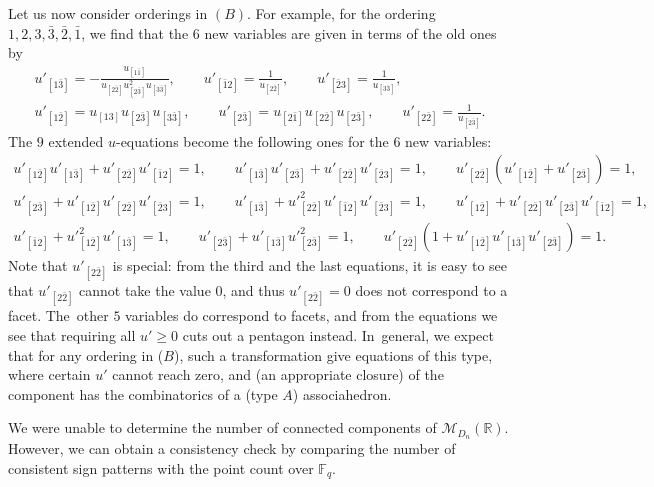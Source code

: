 \documentclass[10pt,a4paper]{amsart}
\def\R{{\mathbb R}}
\def\F{{\mathbb F}}
\def\M{{\mathcal{M}}}
\numberwithin{equation}{section}
\begin{document}
Let us now consider orderings in $(B)$. For example, for the ordering $1, 2, 3, \bar{3}, \bar{2}, \bar{1}$, we find that the $6$ new variables are given in terms of the old ones by
\begin{gather*}
u'_{[1 \bar{3}]}=-\frac{u_{[1 \bar{1}]}}{u_{[2 \bar{2}]} u^2_{[2 \bar{3}]} u_{[3 \bar{3}]}},\qquad u'_{[\bar{1} 2]}=\frac{1}{u_{[2 \bar{2}]}},\qquad
u'_{[\bar{2} 3]}=\frac{1}{u_{[3 \bar{3}]}},
\\
u'_{[1 \bar{2}]}=u_{[13]} u_{[2 \bar{3}]} u_{[3 \bar{3}]},\qquad
u'_{[2 \bar{3}]}=u_{[2 \bar{1}]} u_{[2 \bar{2}]} u_{[2 \bar{3}]},\qquad
u'_{[2 \bar{2}]}=\frac{1}{u_{[2 \bar{3}]}}.
\end{gather*}
The $9$ extended $u$-equations become the following ones for the $6$ new variables:
\begin{gather*}
u'_{[1 \bar{2}]} u'_{[1 \bar{3}]}+u'_{[2 \bar{2}]} u'_{[\bar{1} 2]}=1,\qquad
u'_{[1 \bar{3}]} u'_{[2 \bar{3}]}+ u'_{[2 \bar{2}]} u'_{[\bar{2} 3]}=1,\qquad
u'_{[2 \bar{2}]} (u'_{[1 \bar{2}]}+ u'_{[2 \bar{3}]}) =1,
\\[.5ex]
u'_{[2 \bar{3}]}+ u'_{[1\bar{2}]} u'_{[2 \bar{2}]} u'_{[\bar{2} 3]}=1,\qquad
u'_{[1 \bar{3}]}+ u'^2_{[2 \bar{2}]} u'_{[\bar{1} 2]} u'_{[ \bar{2} 3]}=1,\qquad
u'_{[1 \bar{2}]}+u'_{[2 \bar{2}]} u'_{[2 \bar{3}]} u'_{[\bar{1} 2]}=1,
\\[.5ex]
u'_{[\bar{1} 2]}+u'^2_{[1 \bar{2}]} u'_{[1 \bar{3}]}=1, \qquad
u'_{[2 \bar{3}]}+ u'_{[1 \bar{3}]} u'^2_{[2 \bar{3}]}=1, \qquad
u'_{[2 \bar{2}]} (1+ u'_{[1 \bar{2}]} u'_{[1 \bar{3}]} u'_{[2 \bar{3}]})=1.
\end{gather*}
Note that $u'_{[2 \bar{2}]}$ is special: from the third and the last equations, it is easy to see that $u'_{[ 2 \bar{2}]}$ cannot take the value 0, and thus $u'_{[2 \bar{2}]}=0$ does not correspond to a facet. The~other $5$ variables do correspond to facets, and from the equations we see that requiring all $u' \geq 0$ cuts out a pentagon instead. In~general, we expect that for any ordering in ($B$), such a transformation give equations of this type, where certain $u'$ cannot reach zero, and (an appropriate closure) of the component has the combinatorics of a (type $A$) associahedron.

\bigskip{} %
We were unable to determine the number of connected components of $\M_{D_n}(\R)$. However, we can obtain a consistency check by comparing the number of consistent sign patterns with the point count over $\F_q$.
\end{document}
